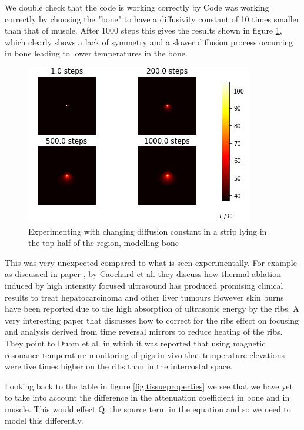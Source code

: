 \documentclass[11pt]{article} %
\begin{document}
We double check that the code is working correctly by Code was working correctly by choosing the "bone" to have a diffusivity constant of 10 times smaller than that of muscle. After 1000 steps this gives the results shown in figure \ref{fig:change-diffusion-constant}, which clearly shows a lack of symmetry and a slower diffusion process occurring in bone leading to lower temperatures in the bone. 

\begin{figure}
	\centering
	\includegraphics[width=0.8\linewidth]{"Report_images/change diffusion constant"}
	\caption{Experimenting with changing diffusion constant in a strip lying in the top half of the region, modelling bone}
	\label{fig:change-diffusion-constant}
\end{figure}

This was very unexpected compared to what is seen  experimentally. For example as discussed in paper \cite{Cochard2009}, by Caochard et al. they discuss how thermal ablation induced by high intensity focused ultrasound has produced promising clinical results to treat hepatocarcinoma and other liver tumours However skin burns have been reported due to the high absorption of ultrasonic energy by the ribs. A very interesting paper that discusses how to correct for the ribs effect on focusing and analysis derived from time reversal mirrors to reduce heating of the ribs. They point to Duam et al. \cite{Daum1999}  in which it was reported that using magnetic resonance temperature monitoring of pigs in vivo that  temperature elevations were five times higher on the ribs than in the intercostal space. 

Looking back to the table in figure \ref{fig:tissueproperties} we see that we have yet to take into account the difference in the attenuation coefficient in bone and in muscle. This would effect Q, the source term in the equation and so we need to model this differently. 
\end{document}

